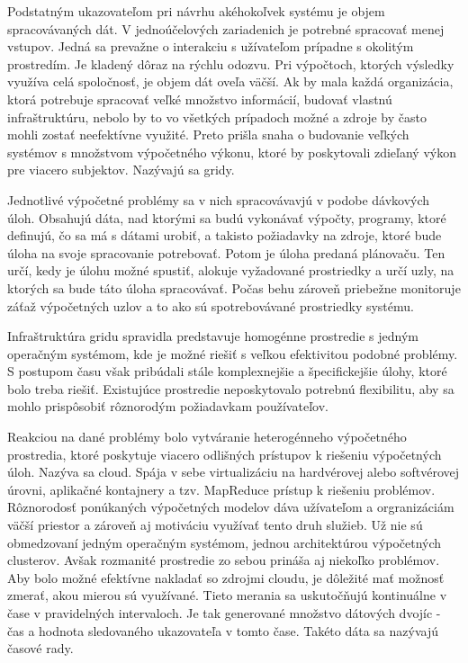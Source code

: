 \documentclass[11pt,final,oneside]{fithesis}
\begin{document}
Podstatným ukazovateľom pri návrhu akéhokoľvek systému je objem spracovávaných dát. V jednoúčelových zariadenich je potrebné spracovať menej vstupov. Jedná sa prevažne o interakciu s užívateľom prípadne 
s okolitým prostredím. Je kladený dôraz na rýchlu odozvu. Pri výpočtoch, ktorých
výsledky využíva celá spoločnosť, je objem dát oveľa väčší. Ak by mala každá organizácia, ktorá potrebuje spracovať veľké množstvo informácií, budovať vlastnú infraštruktúru, nebolo by to vo všetkých prípadoch možné
a zdroje by často mohli zostať neefektívne využité. Preto prišla snaha o budovanie veľkých systémov s množstvom výpočetného výkonu, ktoré by poskytovali zdieľaný výkon pre viacero subjektov. Nazývajú sa gridy.

Jednotlivé výpočetné problémy sa v nich spracovávavjú v podobe dávkových úloh. Obsahujú dáta, nad ktorými sa budú vykonávať výpočty, programy, ktoré definujú, čo sa má s dátami urobiť, a takisto požiadavky na zdroje, ktoré
bude úloha na svoje spracovanie potrebovať. Potom je úloha predaná plánovaču. Ten určí, kedy je úlohu možné spustiť, alokuje vyžadované prostriedky a určí uzly, na ktorých sa bude táto úloha spracovávať. Počas
behu zároveň priebežne monitoruje záťaž výpočetných uzlov a to ako sú spotrebovávané prostriedky systému. 

Infraštruktúra gridu spravidla predstavuje homogénne prostredie s jedným operačným systémom, kde je možné riešiť s veľkou efektivitou podobné problémy. S postupom času však pribúdali stále komplexnejšie 
a špecifickejšie úlohy, ktoré bolo treba riešiť. Existujúce prostredie neposkytovalo potrebnú flexibilitu, aby sa mohlo prispôsobiť rôznorodým požiadavkam používateľov.

Reakciou na dané problémy bolo vytváranie heterogénneho výpočetného prostredia, ktoré poskytuje viacero odlišných prístupov k riešeniu výpočetných úloh. Nazýva sa cloud. Spája v sebe virtualizáciu na hardvérovej alebo
softvérovej úrovni, aplikačné kontajnery a tzv. MapReduce prístup k riešeniu problémov. Rôznorodosť ponúkaných výpočetných modelov dáva užívateľom a orgranizáciám väčší priestor a zároveň aj motiváciu
využívať tento druh služieb. Už nie sú obmedzovaní jedným operačným systémom, jednou architektúrou výpočetných clusterov. Avšak rozmanité prostredie zo sebou prináša aj niekoľko problémov. Aby bolo možné
efektívne nakladať so zdrojmi cloudu, je dôležité mať možnosť zmerať, akou mierou sú využívané. Tieto merania sa uskutočňujú kontinuálne v čase v pravidelných intervaloch. Je tak generované množstvo dátových dvojíc -
čas a hodnota sledovaného ukazovateľa v tomto čase. Takéto dáta sa nazývajú časové rady.
\end{document}
